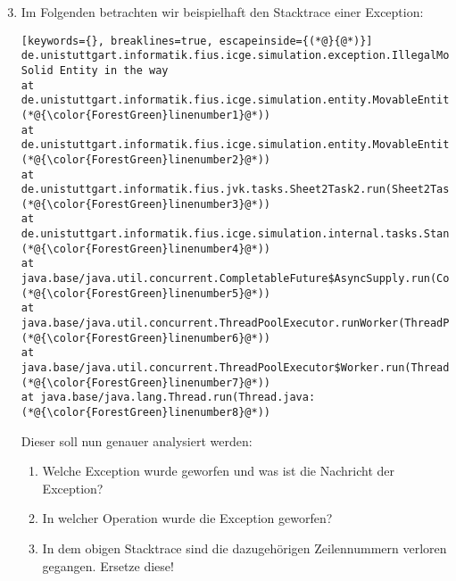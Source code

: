 \begin{enumerate}[label=\alph*)] \setcounter{enumi}{2}
    \item Im Folgenden betrachten wir beispielhaft den Stacktrace einer Exception:
        \begin{lstlisting}[keywords={}, breaklines=true, escapeinside={(*@}{@*)}]
de.unistuttgart.informatik.fius.icge.simulation.exception.IllegalMoveException: Solid Entity in the way
at de.unistuttgart.informatik.fius.icge.simulation.entity.MovableEntity.internalMove(MovableEntity.java:(*@{\color{ForestGreen}linenumber1}@*))
at de.unistuttgart.informatik.fius.icge.simulation.entity.MovableEntity.move(MovableEntity.java:(*@{\color{ForestGreen}linenumber2}@*))
at de.unistuttgart.informatik.fius.jvk.tasks.Sheet2Task2.run(Sheet2Task2.java:(*@{\color{ForestGreen}linenumber3}@*))
at de.unistuttgart.informatik.fius.icge.simulation.internal.tasks.StandardTaskRunner.executeTask(StandardTaskRunner.java:(*@{\color{ForestGreen}linenumber4}@*))
at java.base/java.util.concurrent.CompletableFuture$AsyncSupply.run(CompletableFuture.java:(*@{\color{ForestGreen}linenumber5}@*))
at java.base/java.util.concurrent.ThreadPoolExecutor.runWorker(ThreadPoolExecutor.java:(*@{\color{ForestGreen}linenumber6}@*))
at java.base/java.util.concurrent.ThreadPoolExecutor$Worker.run(ThreadPoolExecutor.java:(*@{\color{ForestGreen}linenumber7}@*))
at java.base/java.lang.Thread.run(Thread.java:(*@{\color{ForestGreen}linenumber8}@*))
        \end{lstlisting}

        Dieser soll nun genauer analysiert werden:

        \begin{enumerate}
            \item[i)] Welche Exception wurde geworfen und was ist die Nachricht der Exception?
            \item[ii)] In welcher Operation wurde die Exception geworfen?
            \item[iii)] In dem obigen Stacktrace sind die dazugehörigen Zeilennummern verloren gegangen. Ersetze diese!  
        \end{enumerate}


\end{enumerate}
